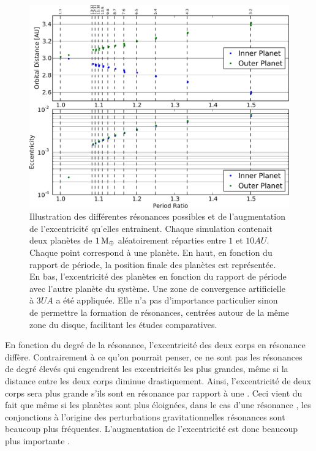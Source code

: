 \begin{figure}[htb]
\centering
\includegraphics[width=0.75\linewidth]{figure/MMR_statistique.pdf}
\caption{Illustration des différentes résonances possibles et de l'augmentation de l'excentricité qu'elles entrainent. Chaque
simulation contenait deux planètes de $1\mathrm{\thinspace M_\oplus}$ aléatoirement réparties entre $1$ et $10\unit{AU}$. Chaque point correspond à
une planète. En haut, en fonction du rapport de période, la position finale des planètes est
représentée. En bas, l'excentricité des planètes en fonction du rapport de période avec l'autre planète du système. Une zone de
convergence artificielle à $3\unit{UA}$ a été appliquée. Elle n'a pas d'importance particulier sinon de permettre la formation
de résonances, centrées autour de la même zone du disque, facilitant les études comparatives.}\label{fig:MMR_statistique}
\end{figure}

En fonction du degré de la résonance, l'excentricité des deux corps en résonance diffère. Contrairement à ce qu'on pourrait
penser, ce ne sont pas les résonances de degré élevés qui engendrent les excentricités les plus grandes, même si la distance
entre les deux corps diminue drastiquement. Ainsi, l'excentricité de deux corps sera plus grande s'ils sont en résonance
 par rapport à une . Ceci vient du fait que même si les planètes sont plus éloignées, dans le cas d'une
résonance , les conjonctions à l'origine des perturbations gravitationnelles résonances sont beaucoup plus
fréquentes. L'augmentation de l'excentricité est donc beaucoup plus importante \citep{murray2000solar}. 

